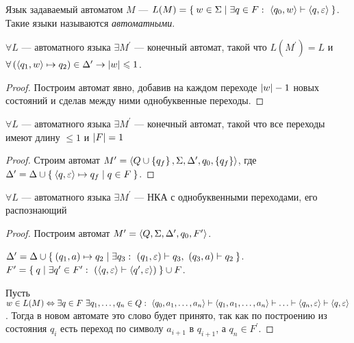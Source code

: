 \begin{define*}
Язык задаваемый автоматом $M$ --- $L(M)=\Set{ w\in\Sigma|\exists q\in F:\ \Braket{ q_{0},w} \vdash\Braket{ q,\varepsilon} } $.
Такие языки называются \emph{автоматными}.\end{define*}
\begin{lem}
$\forall L$ --- автоматного языка $\exists M^{\prime}$ --- конечный
автомат, такой что $L(M^{\prime})=L$ и $\forall\left(\Braket{ q_{1},w} \mapsto q_{2}\right)\in\Delta^{\prime}\rightarrow\left\lvert w \right\rvert\leqslant1$.\end{lem}
\begin{proof}
Построим автомат явно, добавив на каждом переходе $\left\lvert w \right\rvert-1$
новых состояний и сделав между ними однобуквенные переходы.\end{proof}
\begin{lem}
$\forall L$ --- автоматного языка $\exists M^{\prime}$ --- конечный
автомат, такой что все переходы имеют длину $\le1$ и $\left\lvert F \right\rvert=1$\end{lem}
\begin{proof}
Строим автомат $M^{\prime}=\Braket{ Q\cup\left\{ q_{f}\right\} ,\Sigma,\Delta^{\prime},q_{0},\left\{ q_{f}\right\} } $,
где $\Delta^{\prime}=\Delta\cup\Set{ \Braket{ q,\varepsilon} \mapsto q_{f}|q\in F} $.\end{proof}
\begin{lem}
$\forall L$ --- автоматного языка $\exists M^{\prime}$ --- НКА с
однобуквенными переходами, его распознающий\end{lem}
\begin{proof}
Построим автомат $M^{\prime}=\Braket{ Q,\Sigma,\Delta^{\prime},q_{0},F^{\prime}} $.

$\Delta^{\prime}=\Delta\cup\Set{ \left(q_{1},a\right)\mapsto q_{2}|\exists q_{3}:\ \left(q_{1},\varepsilon\right)\vdash q_{3},\ \left(q_{3},a\right)\vdash q_{2}} $.
$F^{\prime}=\Set{ q|\exists q^{\prime}\in F^{\prime}:\ \left(\Braket{ q,\varepsilon} \vdash\Braket{ q^{\prime},\varepsilon} \right)} \cup F$.

Пусть $w\in L(M)\Leftrightarrow\exists q\in F\ \exists q_{1},\ldots,q_{n}\in Q:\ \Braket{ q_{0},a_{1},\ldots,a_{n}} \vdash\Braket{ q_{1},a_{1},\ldots,a_{n}} \vdash\ldots\vdash\Braket{ q_{n},\varepsilon} \vdash\Braket{ q,\varepsilon} $.
Тогда в новом автомате это слово будет принято, так как по построению
из состояния $q_{i}$ есть переход по символу $a_{i+1}$ в $q_{i+1}$,
а $q_{n}\in F^{\prime}$.\end{proof}
\begin{algorithm*}\end{algorithm*}
